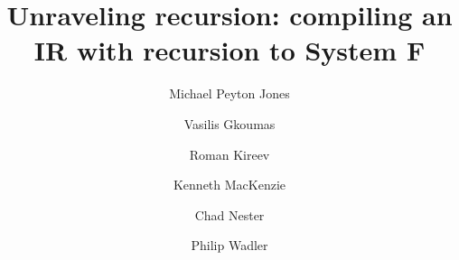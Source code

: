 

\title{Unraveling recursion: compiling an IR with recursion to System F}

\author{
Michael Peyton Jones
\and Vasilis Gkoumas
\and Roman Kireev
\and Kenneth MacKenzie
\and Chad Nester
\and Philip Wadler
}


\usepackage[T1]{fontenc}
\usepackage[utf8]{inputenc}

\usepackage{amsmath}
\usepackage{amssymb}

\usepackage{verbatim}

\usepackage{etoolbox}

\usepackage{todonotes}

\usepackage{semantic}

\usepackage{mathpartir}

\usepackage{hyperref}
\usepackage[capitalise, noabbrev]{cleveref}

\newtoggle{lagda}
\togglefalse{lagda}

